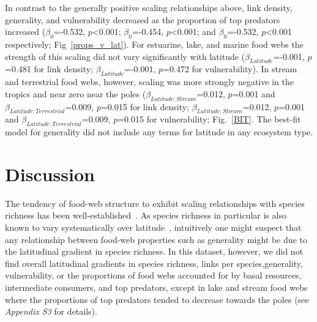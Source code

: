 \documentclass[12pt]{article}
\begin{document}
  In contrast to the generally positive scaling relationships above, link
  density, generality, and vulnerability decreased as the proportion of top
  predators increased ($\beta_0$=-0.532, $p$\textless0.001; $\beta_0$=-0.454,
  $p$\textless0.001; and $\beta_0$=-0.532, $p$\textless0.001 respectively;
  Fig~\ref{props_v_lat}). For estuarine, lake, and marine food webs the
  strength of this scaling did not vary significantly with latitude
  ($\beta_{Latitude}$=-0.001, $p$=0.481 for link density;
  $\beta_{Latitude}$=-0.001, $p$=0.472 for vulnerability).
  In stream and terrestrial food webs, however, scaling was more strongly negative in the 
  tropics and near zero near the poles ($\beta_{Latitude:Stream}$=0.012, $p$=0.001 
  and $\beta_{Latitude:Terrestrial}$=0.009, $p$=0.015 for link density;
  $\beta_{Latitude:Stream}$=0.012, $p$=0.001 and $\beta_{Latitude:Terrestrial}$=0.009, $p$=0.015
  for vulnerability; Fig.~\ref{BIT}. The best-fit model for generality did not include any terms
  for latitude in any ecosystem type.


\section*{Discussion}

  The tendency of food-web structure to exhibit scaling relationships with
  species richness has been well-established~\citep{Dunne2004,Riede2010}. As
  species richness in particular is also known to vary systematically over
  latitude~\citep{Kaufman1995,Macpherson2002,Hillebrand2004,Schemske2009},
  intuitively one might suspect that any relationship between food-web
  properties such as generality might be due to the latitudinal gradient in
  species richness. In this dataset, however, we did not find overall
  latitudinal gradients in species richness, links per species,generality,
  vulnerability, or the proportions of food webs accounted for by basal
  resources, intermediate consumers, and top predators, except in lake and
  stream food webs where the proportions of top predators tended to decrease
  towards the poles  (see \emph{Appendix S3} for details).
\end{document}
